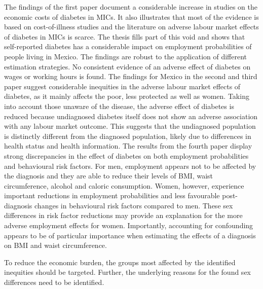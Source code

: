 The findings of the first paper document a considerable increase in studies on the economic costs of diabetes in \acp{MIC}. It also illustrates that most of the evidence is based on cost-of-illness studies and the literature on adverse labour market effects of diabetes in \acp{MIC} is scarce. The thesis fills part of this void and shows that self-reported diabetes has a considerable impact on employment probabilities of people living in Mexico. The findings are robust to the application of different estimation strategies. No consistent evidence of an adverse effect of diabetes on wages or working hours is found. The findings for Mexico in the second and third paper suggest considerable inequities in the adverse labour market effects of diabetes, as it mainly affects the poor, less protected as well as women. Taking into account those unaware of the disease, the adverse effect of diabetes is reduced because undiagnosed diabetes itself does not show an adverse association with any labour market outcome. This suggests that the undiagnosed population is distinctly different from the diagnosed population, likely due to differences in health status and health information. The results from the fourth paper display strong discrepancies in the effect of diabetes on both employment probabilities and behavioural risk factors. For men, employment appears not to be affected by the diagnosis and they are able to reduce their levels of \ac{BMI}, waist circumference, alcohol and caloric consumption. Women, however, experience important reductions in employment probabilities and less favourable post-diagnosis changes in behavioural risk factors compared to men. These sex differences in risk factor reductions may provide an explanation for the more adverse employment effects for women. Importantly, accounting for confounding appears to be of particular importance when estimating the effects of a diagnosis on \ac{BMI} and waist circumference.

To reduce the economic burden, the groups most affected by the identified inequities should be targeted. Further, the underlying reasons for the found sex differences need to be identified.



\tableofcontents

\cleardoublepage
{}
\listoffigures

\cleardoublepage
{} 
\listoftables
\cleardoublepage

